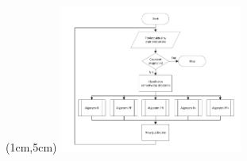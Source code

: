 \documentclass{beamer}
\begin{document}
\begin{frame}
\begin{textblock*}{6cm}(1cm,5cm) %
	\includegraphics[page=6,width=6cm]{img/hybrid_algorithm.pdf}
\end{textblock*}


\end{frame}
\end{document}
